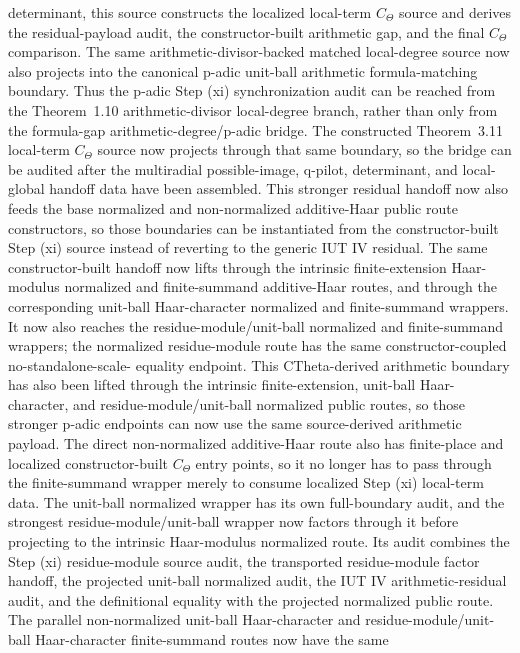 \documentclass[11pt]{article}
\theoremstyle{plain}
\theoremstyle{definition}
\theoremstyle{remark}
\begin{document}
	determinant, this source constructs the localized local-term \(C_{\Theta}\)
	source and derives the residual-payload audit, the constructor-built arithmetic
	gap, and the final \(C_{\Theta}\) comparison.
	The same arithmetic-divisor-backed matched local-degree source now also
	projects into the canonical p-adic unit-ball arithmetic formula-matching
	boundary.  Thus the p-adic Step (xi) synchronization audit can be reached from
	the Theorem~1.10 arithmetic-divisor local-degree branch, rather than only from
	the formula-gap arithmetic-degree/p-adic bridge.  The constructed
	Theorem~3.11 local-term \(C_{\Theta}\) source now projects through that same
	boundary, so the bridge can be audited after the multiradial possible-image,
	q-pilot, determinant, and local-global handoff data have been assembled.
	This stronger residual handoff now also feeds the base normalized and
	non-normalized additive-Haar public route constructors, so those boundaries can
be instantiated from the constructor-built Step (xi) source instead of
reverting to the generic IUT IV residual.  The same constructor-built handoff
now lifts through the
intrinsic finite-extension Haar-modulus normalized and finite-summand
additive-Haar routes, and through the corresponding unit-ball Haar-character
normalized and finite-summand wrappers.  It now also reaches the
residue-module/unit-ball normalized and finite-summand wrappers; the normalized
residue-module route has the same constructor-coupled no-standalone-scale-
equality endpoint.
This CTheta-derived arithmetic boundary has also been lifted through the
intrinsic finite-extension, unit-ball Haar-character, and
residue-module/unit-ball normalized public routes, so those stronger p-adic
endpoints can now use the same source-derived arithmetic payload.  The
direct non-normalized additive-Haar route also has finite-place and localized
constructor-built \(C_\Theta\) entry points, so it no longer has to pass through
the finite-summand wrapper merely to consume localized Step (xi) local-term
data.  The
unit-ball normalized wrapper has its own full-boundary audit, and the strongest
residue-module/unit-ball wrapper now factors through it before projecting to
the intrinsic Haar-modulus normalized route.  Its audit combines the Step (xi)
residue-module source audit, the transported residue-module factor handoff,
the projected unit-ball normalized audit, the IUT IV arithmetic-residual audit,
and the definitional equality with the projected normalized public route.
The parallel non-normalized unit-ball Haar-character and
residue-module/unit-ball Haar-character finite-summand routes now have the same
\end{document}
